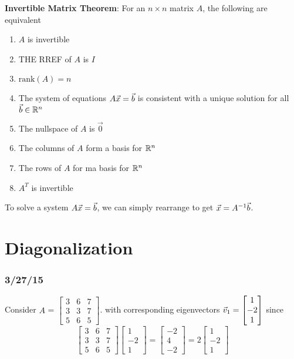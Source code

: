 \documentclass[english, 12pt]{article}
\begin{document}
\begin{thrm}
\textbf{Invertible Matrix Theorem}:
For an $n \times n$ matrix $A$, the following are equivalent
\begin{enumerate}
\item $A$ is invertible
\item THE RREF of $A$ is $I$
\item $\text{rank}(A) = n$
\item The system of equations $A\vec{x} = \vec{b}$ is consistent with a unique solution for all $\vec{b} \in {\mathbb{R}}^n$
\item The nullspace of $A$ is $\vec{0}$
\item The columns of $A$ form a basis for ${\mathbb{R}}^n$
\item The rows of $A$ for ma basis for ${\mathbb{R}}^n$
\item $A^T$ is invertible
\end{enumerate}
To solve a system $A\vec{x} = \vec{b}$, we can simply rearrange to get $\vec{x} = A^{-1} \vec{b}$.
\end{thrm}


\section{Diagonalization}


\subsubsection*{3/27/15}

\begin{exmp}
Consider $A$ = $\begin{bmatrix} 3 & 6 & 7 \\ 3 & 3 & 7 \\ 5 & 6 & 5 \end{bmatrix}$. with corresponding eigenvectors $\vec{v}_{1} = \begin{bmatrix} 1 \\ -2 \\ 1 \end{bmatrix}$ since
\[\begin{bmatrix} 3 & 6 & 7 \\ 3 & 3 & 7 \\ 5 & 6 & 5 \end{bmatrix} \begin{bmatrix} 1 \\ -2 \\ 1 \end{bmatrix} = \begin{bmatrix} -2 \\ 4 \\ -2 \end{bmatrix} = 2 \begin{bmatrix} 1 \\ -2 \\ 1 \end{bmatrix}\]
\end{exmp}
\end{document}
